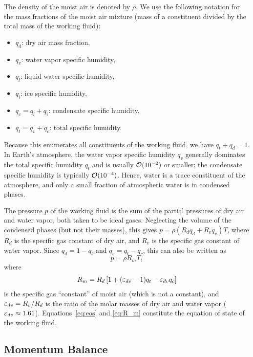 \documentclass{article}
\begin{document}
The density of the moist air is denoted by $\rho$. We use the following notation for the mass fractions of the moist air mixture (mass of a constituent divided by the total mass of the working fluid):
\begin{itemize}
\item $q_d$: dry air mass fraction,
\item $q_v$: water vapor specific humidity,
\item $q_l$: liquid water specific humidity,
\item $q_i$: ice specific humidity,
\item $q_c = q_l + q_i$: condensate specific humidity,
\item $q_t = q_v + q_c$: total specific humidity.
\end{itemize}
Because this enumerates all constituents of the working fluid, we have $q_t + q_d = 1$. In Earth's atmosphere, the water vapor specific humidity $q_v$ generally dominates the total specific humidity $q_t$ and is usually $\mathcal{O}(10^{-2})$ or smaller; the condensate specific humidity is typically $\mathcal{O}(10^{-4})$. Hence, water is a trace constituent of the atmosphere, and only a small fraction of atmospheric water is in condensed phases. 

The pressure $p$ of the working fluid is the sum of the partial pressures of dry air and water vapor, both taken to be ideal gases. Neglecting the volume of the condensed phases (but not their masses), this gives $p = \rho (R_d q_d + R_v q_v) T$, where $R_d$ is the specific gas constant of dry air, and $R_v$ is the specific gas constant of water vapor. Since $q_d = 1-q_t$ and $q_v = q_t - q_c$, this can also be written as
\begin{equation}
    p = \rho R_m T,
\label{eq:eos}
\end{equation}
where
\begin{equation}
    R_m = R_d \left[1 + (\varepsilon_{dv}-1)q_t - \varepsilon_{dv} q_c\right]
\label{eq:R_m}
\end{equation}
is the specific gas ``constant'' of moist air (which is not a constant), and $\varepsilon_{dv} = R_v/R_d$ is the ratio of the molar masses of dry air and water vapor ($\varepsilon_{dv} \approx 1.61$). Equations~\eqref{eq:eos} and \eqref{eq:R_m} constitute the equation of state of the working fluid.

\subsection{Momentum Balance}
\end{document}
